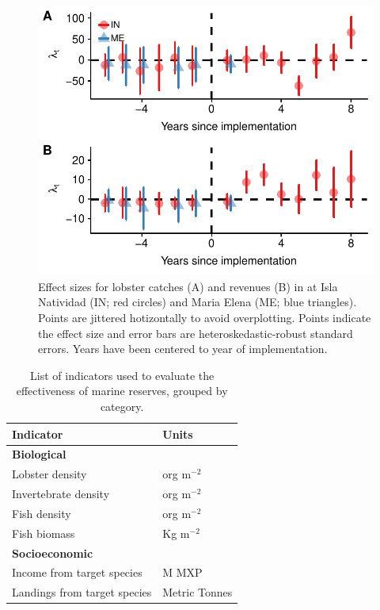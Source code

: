 \documentclass{frontiersSCNS}
\begin{document}
\begin{figure}
\centering
\includegraphics{manuscript_files/figure-latex/unnamed-chunk-9-1.pdf}
\caption{\label{fig:unnamed-chunk-9}\label{fig:lobsters}Effect sizes for
lobster catches (A) and revenues (B) in at Isla Natividad (IN; red
circles) and Maria Elena (ME; blue triangles). Points are jittered
hotizontally to avoid overplotting. Points indicate the effect size and
error bars are heteroskedastic-robust standard errors. Years have been
centered to year of implementation.}
\end{figure}

\begin{table}[H]

\caption{\label{tab:unnamed-chunk-10}\label{table:indicators}List of indicators used to evaluate the effectiveness of marine reserves, grouped by category.}
\centering
\begin{tabular}[t]{l|l}
\hline
Indicator & Units\\
\hline
\multicolumn{2}{l}{\textbf{Biological}}\\
\hline
\hspace{1em}Lobster density & org $\mathrm{m}^{-2}$\\
\hline
\hspace{1em}Invertebrate density & org $\mathrm{m}^{-2}$\\
\hline
\hspace{1em}Fish density & org $\mathrm{m}^{-2}$\\
\hline
\hspace{1em}Fish biomass & Kg $\mathrm{m}^{-2}$\\
\hline
\multicolumn{2}{l}{\textbf{Socioeconomic}}\\
\hline
\hspace{1em}Income from target species & M MXP\\
\hline
\hspace{1em}Landings from target species & Metric Tonnes\\
\hline
\end{tabular}
\end{table}
\end{document}
